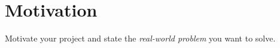 \section{Motivation}
Motivate your project and state the \textit{real-world problem} you want to solve.


